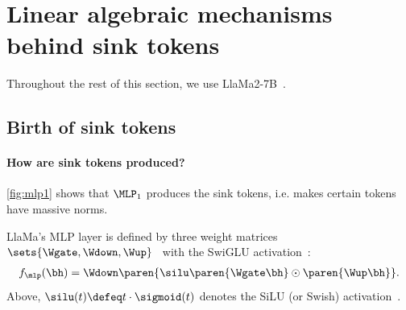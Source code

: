 

\section{Linear algebraic mechanisms behind sink tokens}




Throughout the rest of this section, we use LlaMa2-7B~\citep{touvron2023llama}.

\subsection{Birth of sink tokens}

\paragraph{How are sink tokens produced?}

\cref{fig:mlp1} shows that $\MLP_1$ produces the sink tokens, i.e. makes certain tokens have massive norms.


LlaMa's MLP layer is defined by three weight matrices $\sets{\Wgate, \Wdown, \Wup}$~ with the SwiGLU activation~\citep{shazeer2020glu}:
\begin{align}
    f_{\mlp}(\bh) = \Wdown \paren{ \silu\paren{ \Wgate\bh } \odot \paren{\Wup\bh} }.
\end{align}
Above, $\silu(t) \defeq t\cdot \sigmoid(t)$ denotes the SiLU (or Swish) activation~\citep{ramachandran2017searching}.

